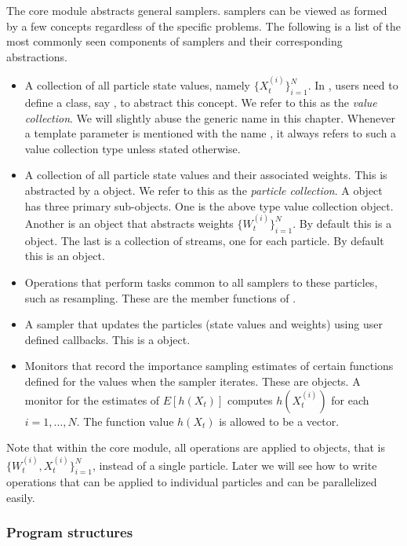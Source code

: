 The core module abstracts general \smc samplers. \smc samplers can be viewed
as formed by a few concepts regardless of the specific problems. The following
is a list of the most commonly seen components of \smc samplers and their
corresponding \vsmc abstractions.
\begin{itemize}
  \item A collection of all particle state values, namely
    $\{X_t^{(i)}\}_{i=1}^N$. In \vsmc, users need to define a class, say
    , to abstract this concept. We refer to this as the \emph{value
      collection}. We will slightly abuse the generic name  in this
    chapter. Whenever a template parameter is mentioned with the name
    , it always refers to such a value collection type unless stated
    otherwise.
  \item A collection of all particle state values and their associated
    weights. This is abstracted by a  object. We refer to
    this as the \emph{particle collection}. A  object has
    three primary sub-objects. One is the above type  value collection
    object. Another is an object that abstracts weights
    $\{W_t^{(i)}\}_{i=1}^N$. By default this is a  object. The
    last is a collection of \rng streams, one for each particle. By default
    this is an  object.
  \item Operations that perform tasks common to all samplers to these
    particles, such as resampling. These are the member functions of
    .
  \item A sampler that updates the particles (state values and weights) using
    user defined callbacks. This is a  object.
  \item Monitors that record the importance sampling estimates of certain
    functions defined for the values when the sampler iterates. These are
     objects. A monitor for the estimates of $E[h(X_t)]$
    computes $h(X_t^{(i)})$ for each $i = 1,\dots,N$. The function value
    $h(X_t)$ is allowed to be a vector.
\end{itemize}
Note that within the core module, all operations are applied to
 objects, that is $\{W_t^{(i)},X_t^{(i)}\}_{i=1}^N$, instead
of a single particle. Later we will see how to write operations that can be
applied to individual particles and can be parallelized easily.

\subsubsection{Program structures}
\label{ssub:Program structures}

